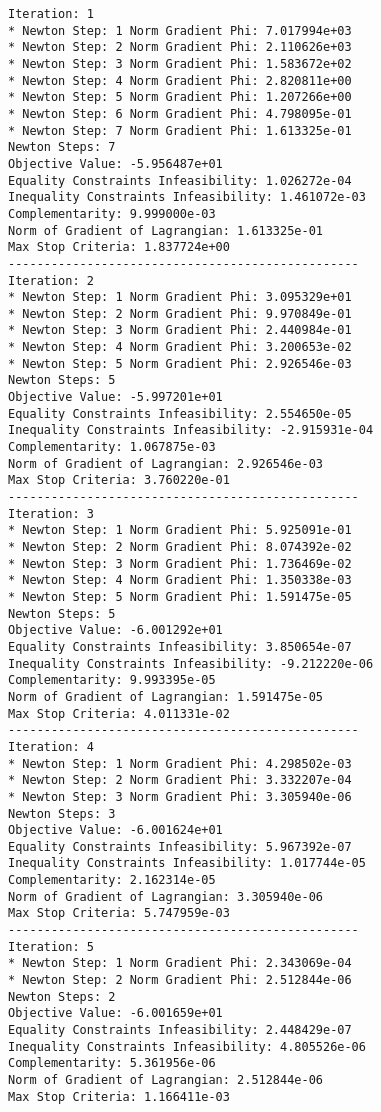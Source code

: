 \documentclass{article}
\begin{document}
\scriptsize
\begin{minipage}[t]{0.45\textwidth}
\begin{verbatim}
Iteration: 1
* Newton Step: 1 Norm Gradient Phi: 7.017994e+03
* Newton Step: 2 Norm Gradient Phi: 2.110626e+03
* Newton Step: 3 Norm Gradient Phi: 1.583672e+02
* Newton Step: 4 Norm Gradient Phi: 2.820811e+00
* Newton Step: 5 Norm Gradient Phi: 1.207266e+00
* Newton Step: 6 Norm Gradient Phi: 4.798095e-01
* Newton Step: 7 Norm Gradient Phi: 1.613325e-01
Newton Steps: 7
Objective Value: -5.956487e+01
Equality Constraints Infeasibility: 1.026272e-04
Inequality Constraints Infeasibility: 1.461072e-03
Complementarity: 9.999000e-03
Norm of Gradient of Lagrangian: 1.613325e-01
Max Stop Criteria: 1.837724e+00
-------------------------------------------------
Iteration: 2
* Newton Step: 1 Norm Gradient Phi: 3.095329e+01
* Newton Step: 2 Norm Gradient Phi: 9.970849e-01
* Newton Step: 3 Norm Gradient Phi: 2.440984e-01
* Newton Step: 4 Norm Gradient Phi: 3.200653e-02
* Newton Step: 5 Norm Gradient Phi: 2.926546e-03
Newton Steps: 5
Objective Value: -5.997201e+01
Equality Constraints Infeasibility: 2.554650e-05
Inequality Constraints Infeasibility: -2.915931e-04
Complementarity: 1.067875e-03
Norm of Gradient of Lagrangian: 2.926546e-03
Max Stop Criteria: 3.760220e-01
-------------------------------------------------
Iteration: 3
* Newton Step: 1 Norm Gradient Phi: 5.925091e-01
* Newton Step: 2 Norm Gradient Phi: 8.074392e-02
* Newton Step: 3 Norm Gradient Phi: 1.736469e-02
* Newton Step: 4 Norm Gradient Phi: 1.350338e-03
* Newton Step: 5 Norm Gradient Phi: 1.591475e-05
Newton Steps: 5
Objective Value: -6.001292e+01
Equality Constraints Infeasibility: 3.850654e-07
Inequality Constraints Infeasibility: -9.212220e-06
Complementarity: 9.993395e-05
Norm of Gradient of Lagrangian: 1.591475e-05
Max Stop Criteria: 4.011331e-02
-------------------------------------------------
Iteration: 4
* Newton Step: 1 Norm Gradient Phi: 4.298502e-03
* Newton Step: 2 Norm Gradient Phi: 3.332207e-04
* Newton Step: 3 Norm Gradient Phi: 3.305940e-06
Newton Steps: 3
Objective Value: -6.001624e+01
Equality Constraints Infeasibility: 5.967392e-07
Inequality Constraints Infeasibility: 1.017744e-05
Complementarity: 2.162314e-05
Norm of Gradient of Lagrangian: 3.305940e-06
Max Stop Criteria: 5.747959e-03
-------------------------------------------------
Iteration: 5
* Newton Step: 1 Norm Gradient Phi: 2.343069e-04
* Newton Step: 2 Norm Gradient Phi: 2.512844e-06
Newton Steps: 2
Objective Value: -6.001659e+01
Equality Constraints Infeasibility: 2.448429e-07
Inequality Constraints Infeasibility: 4.805526e-06
Complementarity: 5.361956e-06
Norm of Gradient of Lagrangian: 2.512844e-06
Max Stop Criteria: 1.166411e-03
\end{verbatim}
\end{minipage}
\end{document}
